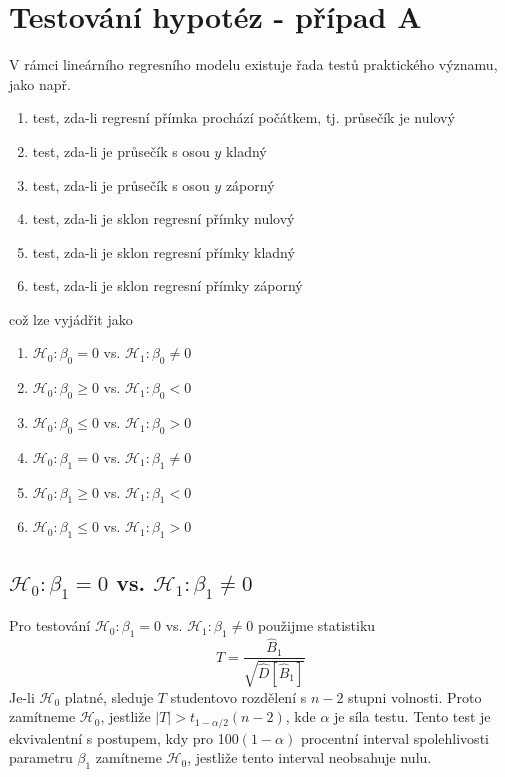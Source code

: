 \section{Testování hypotéz - případ A}

V rámci lineárního regresního modelu existuje řada testů praktického významu, jako např.
\begin{enumerate}
\item test, zda-li regresní přímka prochází počátkem, tj. průsečík je nulový
\item test, zda-li je průsečík s osou $y$ kladný
\item test, zda-li je průsečík s osou $y$ záporný
\item test, zda-li je sklon regresní přímky nulový
\item test, zda-li je sklon regresní přímky kladný
\item test, zda-li je sklon regresní přímky záporný
\end{enumerate}
což lze vyjádřit jako
\begin{enumerate}
\item $\mathscr{H}_0: \beta_0 = 0$ vs. $\mathscr{H}_1: \beta_0 \neq 0$
\item $\mathscr{H}_0: \beta_0 \ge 0$ vs. $\mathscr{H}_1: \beta_0 < 0$
\item $\mathscr{H}_0: \beta_0 \le 0$ vs. $\mathscr{H}_1: \beta_0 > 0$
\item $\mathscr{H}_0: \beta_1 = 0$ vs. $\mathscr{H}_1: \beta_1 \neq 0$
\item $\mathscr{H}_0: \beta_1 \ge 0$ vs. $\mathscr{H}_1: \beta_1 < 0$
\item $\mathscr{H}_0: \beta_1 \le 0$ vs. $\mathscr{H}_1: \beta_1 > 0$
\end{enumerate}

\subsection{$\mathscr{H}_0: \beta_1 = 0$ vs. $\mathscr{H}_1: \beta_1 \neq 0$}

Pro testování $\mathscr{H}_0: \beta_1 = 0$ vs. $\mathscr{H}_1: \beta_1 \neq 0$ použijme statistiku
\begin{equation*}
T = \frac{\hat{B}_1}{\sqrt{\hat{D}[\hat{B}_1]}}
\end{equation*}
Je-li $\mathscr{H}_0$ platné, sleduje $T$ studentovo rozdělení s $n - 2$ stupni volnosti. Proto zamítneme $\mathscr{H}_0$, jestliže $|T| > t_{1 - \alpha / 2}(n - 2)$, kde $\alpha$ je síla testu. Tento test je ekvivalentní s postupem, kdy pro 100$(1 - \alpha)$ procentní interval spolehlivosti parametru $\beta_1$ zamítneme $\mathscr{H}_0$, jestliže tento interval neobsahuje nulu.

